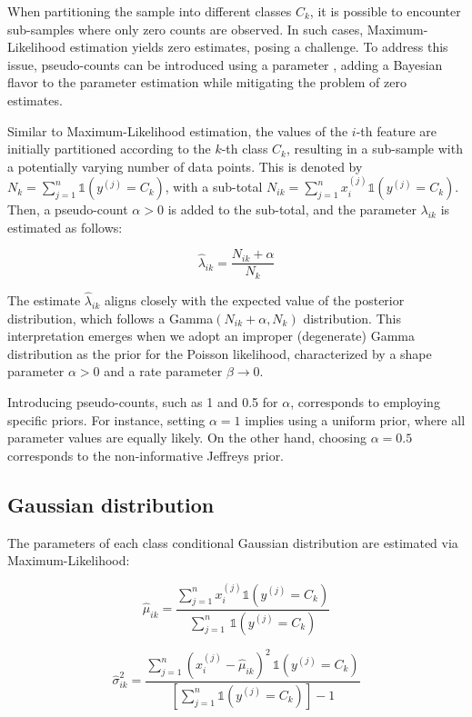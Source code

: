 \documentclass{article}\usepackage[]{graphicx}\usepackage[]{xcolor}
\begin{document}
When partitioning the sample into different classes $C_k$, it is possible to encounter sub-samples where only zero counts are observed. In such cases, Maximum-Likelihood estimation yields zero estimates, posing a challenge. To address this issue, pseudo-counts can be introduced using a parameter \textcolor{darkgreen}{{}}, adding a Bayesian flavor to the parameter estimation while mitigating the problem of zero estimates.

Similar to Maximum-Likelihood estimation, the values of the $i$-th feature are initially partitioned according to the $k$-th class $C_k$, resulting in a sub-sample with a potentially varying number of data points. This is denoted by $N_k = \sum_{j=1}^n \mathbb{1}(y^{(j)} = C_k)$, with a sub-total $N_{ik} = \sum_{j=1}^n x_i^{(j)}\mathbb{1}(y^{(j)} = C_k)$. Then, a pseudo-count $\alpha > 0$ is added to the sub-total, and the parameter $\lambda_{ik}$ is estimated as follows:

$$\hat{\lambda}_{ik} = \frac{N_{ik} + \alpha}{N_k}$$

The estimate $\hat{\lambda}_{ik}$ aligns closely with the expected value of the posterior distribution, which follows a Gamma$(N_{ik} + \alpha, N_k)$ distribution. This interpretation emerges when we adopt an improper (degenerate) Gamma distribution as the prior for the Poisson likelihood, characterized by a shape parameter $\alpha > 0$ and a rate parameter $\beta \rightarrow 0$.

Introducing pseudo-counts, such as 1 and 0.5 for $\alpha$, corresponds to employing specific priors. For instance, setting $\alpha = 1$ implies using a uniform prior, where all parameter values are equally likely. On the other hand, choosing $\alpha = 0.5$ corresponds to the non-informative Jeffreys prior.

\subsection{Gaussian distribution}

The parameters of each class conditional Gaussian distribution are estimated via Maximum-Likelihood:

$$\hat{\mu}_{ik} = \frac{\sum_{j=1}^n x_i^{(j)} \mathbb{1}(y^{(j)} = C_k) }{\sum_{j=1}^n \, \mathbb{1}(y^{(j)} = C_k)}$$

$$\hat{\sigma}^2_{ik} = \frac{\sum_{j=1}^n (x_i^{(j)} - \hat{\mu}_{ik})^2 \, \mathbb{1}(y^{(j)} = C_k) }{\left[ \sum_{j=1}^n  \mathbb{1}(y^{(j)} = C_k) \right] - 1}$$
\end{document}
